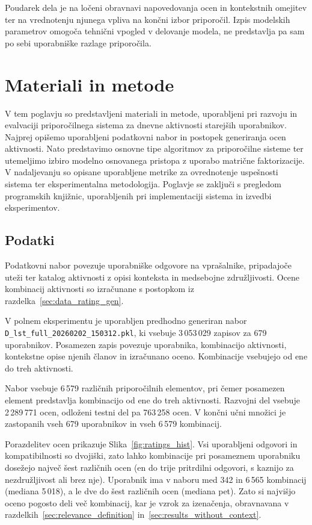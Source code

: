 \documentclass[a4paper,twoside,openright,12pt,slovene]{book}
\begin{document}
Poudarek dela je na ločeni obravnavi napovedovanja
ocen in kontekstnih omejitev ter na vrednotenju
njunega vpliva na končni izbor priporočil.
Izpis modelskih parametrov omogoča tehnični
vpogled v delovanje modela, ne predstavlja pa
sam po sebi uporabniške razlage priporočila.


\chapter{Materiali in metode} 
\label{chap:methods}
V tem poglavju so predstavljeni materiali in metode, uporabljeni pri razvoju in evalvaciji priporo\-čilnega sistema za dnevne aktivnosti starejših uporabnikov. Najprej opišemo uporabljeni podatkovni nabor in postopek generiranja ocen aktivnosti. Nato predstavimo osnovne tipe algoritmov za priporočilne sisteme ter utemeljimo izbiro modelno osnovanega pristopa z uporabo matrične faktorizacije. V nadaljevanju so opisane uporabljene metrike za ovrednotenje uspešnosti sistema ter eksperimentalna metodologija. Poglavje se zaključi s pregledom programskih knjižnic, uporabljenih pri implementaciji sistema in izvedbi eksperimentov.


\section{Podatki} \label{sec:data}
Podatkovni nabor povezuje uporabniške odgovore na vprašalnike,
pripadajoče uteži ter katalog aktivnosti z opisi konteksta in
medsebojne združljivosti. Ocene kombinacij aktivnosti so izračunane
s postopkom iz razdelka~\ref{sec:data_rating_gen}.

V polnem eksperimentu je uporabljen predhodno generiran nabor
\texttt{D\_lst\_full\_20260202\_150312.pkl}, ki vsebuje
3\,053\,029 zapisov za 679 uporabnikov. Posamezen zapis povezuje
uporabnika, kombinacijo aktivnosti, kontekstne opise njenih članov
in izračunano oceno. Kombinacije vsebujejo od ene do treh aktivnosti.

Nabor vsebuje 6\,579 različnih priporočilnih elementov,
pri čemer posamezen element predstavlja kombinacijo od ene
do treh aktivnosti. Razvojni del vsebuje 2\,289\,771 ocen,
odloženi testni del pa 763\,258 ocen.
V končni učni množici je zastopanih vseh 679 uporabnikov
in vseh 6\,579 kombinacij.

Porazdelitev ocen prikazuje Slika~\ref{fig:ratings_hist}. Vsi uporabljeni
odgovori in kompatibilnosti so dvojiški, zato lahko kombinacije pri
posameznem uporabniku dosežejo največ šest različnih ocen (en do trije
pritrdilni odgovori, s kaznijo za nezdružljivost ali brez nje).
Uporabnik ima v naboru med 342 in 6\,565 kombinacij (mediana 5\,018),
a le dve do šest različnih ocen (mediana pet). Zato si najvišjo oceno
pogosto deli več kombinacij, kar je vzrok za izenačenja, obravnavana
v razdelkih~\ref{sec:relevance_definition}
in~\ref{sec:results_without_context}.
\end{document}
